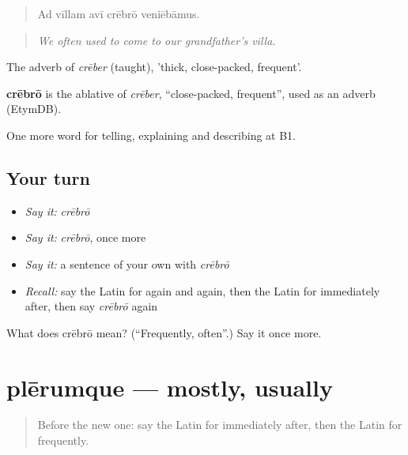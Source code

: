 \begin{quote}
Ad vīllam avī crēbrō veniēbāmus.
\end{quote}

\begin{quote}
\emph{We often used to come to our grandfather's villa.}
\end{quote}

The adverb of \emph{crēber} (taught), 'thick, close-packed, frequent'.

\begin{cousinweb}
\textbf{crēbrō} is the ablative of \emph{crēber}, \textquotedblleft{}close-packed, frequent\textquotedblright{}, used as an adverb (EtymDB).
\end{cousinweb}

\begin{grammarlens}[title={What you've built}]
One more word for telling, explaining and describing at B1.
\end{grammarlens}

\subsection*{Your turn}
\begin{itemize}
\raggedright
  \item \emph{Say it:} \emph{crēbrō}
  \item \emph{Say it:} \emph{crēbrō}, once more
  \item \emph{Say it:} a sentence of your own with \emph{crēbrō}
  \item \emph{Recall:} say the Latin for again and again, then the Latin for immediately after, then say \emph{crēbrō} again
\end{itemize}

\begin{tcolorbox}[breakable,colback=teal!4,colframe=teal!35!black,title={Before you move on}]
What does crēbrō mean? (\textquotedblleft{}Frequently, often\textquotedblright{}.) Say it once more.
\end{tcolorbox}
\section[plērumque]{plērumque — mostly, usually}

\label{lesson:LA-C294-plerumque}



\begin{quote}
Before the new one: say the Latin for immediately after, then the Latin for frequently.
\end{quote}


